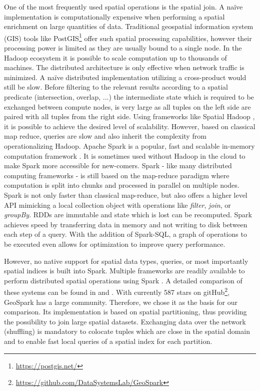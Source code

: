 \documentclass[conference]{IEEEtran}
\begin{document}
One of the most frequently used spatial operations is the spatial join. 
A naïve implementation is computationally expensive when performing a spatial enrichment on large quantities of data. Traditional geospatial information system (GIS) tools like PostGIS\footnote{\url{https://postgis.net/}} offer such spatial processing capabilities,
however their processing power is limited as they are usually bound to a single node.
In the Hadoop ecosystem it is possible to scale computation up to thousands of machines.
The distributed architecture is only effective when network traffic is minimized.
A naïve distributed implementation utilizing a cross-product would still be slow.
Before filtering to the relevant results according to a spatial predicate (intersection, overlap, ...) the intermediate state which is required to be exchanged between compute nodes, is very large as all tuples on the left side are paired with all tuples from the right side. 
Using frameworks like Spatial Hadoop \cite{Eldawy2015}, it is possible to achieve the desired level of scalability.
However, based on classical map reduce, queries are slow and also inherit the complexity from operationalizing Hadoop.
Apache Spark is a popular, fast and scalable in-memory computation framework \cite{Zaharia2012}.
It is sometimes used without Hadoop in the cloud to make Spark more accessible for new-comers.
Spark - like many distributed computing frameworks - is still based on the map-reduce paradigm where computation is split into chunks and processed in parallel on multiple nodes.
Spark is not only faster than classical map-reduce, but also offers a higher level API mimicking a local collection object with operations like \emph{filter}, \emph{join}, or \emph{groupBy}.
RDDs are immutable and state which is lost can be recomputed.
Spark achieves speed by transferring data in memory and not writing to disk between each step of a query.
With the addition of Spark-SQL, a graph of operations to be executed even allows for  optimization to improve query performance.

However, no native support for spatial data types, queries, or most importantly spatial indices is built into Spark.
Multiple frameworks are readily available to perform distributed spatial operations using Spark \cite{Tangy2015, Yu2017, Xie2016, Yu2019, Harsha2010}.
A detailed comparison of these systems can be found in \cite{Yu2019} and \cite{Garcia-Garcia2017}.
With currently 587 stars on gitHub\footnote{\url{https://github.com/DataSystemsLab/GeoSpark}}, GeoSpark \cite{Yu2015} has a large community.
Therefore, we chose it as the basis for our comparison.
Its implementation is based on spatial partitioning, thus providing the possibility to join large spatial datasets.
Exchanging data over the network (shuffling) is mandatory to colocate tuples which are close in the spatial domain and to enable fast local queries of a spatial index for each partition.
\end{document}

